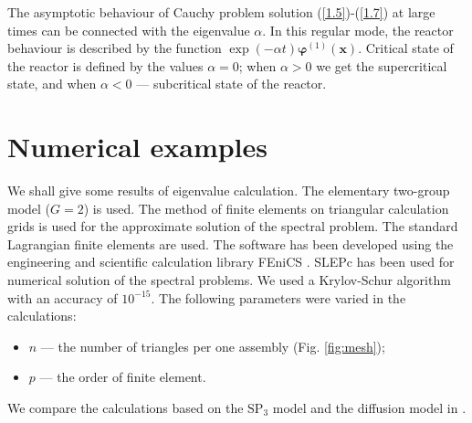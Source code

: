 \documentclass[authoryear]{elsarticle}
\begin{document}
The asymptotic behaviour of Cauchy problem solution (\ref{1.5})-(\ref{1.7}) at large times can be connected with the eigenvalue $\alpha$.
In this regular mode, the reactor behaviour is described by the function $\exp(-\alpha t) \bm \varphi^{(1)}(\bm x)$.
Critical state of the reactor is defined by the values $\alpha = 0$; when $\alpha > 0$ we get the supercritical state, and when $\alpha <  0$ --- subcritical state of the reactor.

\section{Numerical examples}
We shall give some results of eigenvalue calculation. The elementary two-group model ($G = 2$) is used. 
The method of finite elements \citep{brenner2008, quarteroni2008} on triangular calculation grids is used for the approximate solution of the spectral problem. 
The standard Lagrangian finite elements are used.
The software has been developed using the engineering and scientific calculation library FEniCS \citep{logg2012}.
SLEPc has been used for numerical solution of the spectral problems.
We used a Krylov-Schur algorithm with an accuracy of $10^{-15}$.
The following parameters were varied in the calculations:
\begin{itemize}\itemsep1pt \parskip0pt 
\item $n$ --- the number of triangles per one assembly (Fig. \ref{fig:mesh}); 
\item $p$ --- the order of finite element.
\end{itemize}
We compare the calculations based on the $\mathrm{SP_3}$ model and the diffusion model  in \citep{avvakumov2014, avvakumov2017spectral}.
\end{document}

